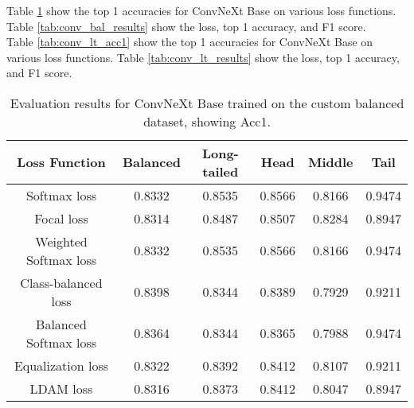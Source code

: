 Table \ref{tab:conv_bal_acc1} show the top 1 accuracies for ConvNeXt Base on various loss functions. Table \ref{tab:conv_bal_results} show the loss, top 1 accuracy, and F1 score.\\

Table \ref{tab:conv_lt_acc1} show the top 1 accuracies for ConvNeXt Base on various loss functions. Table \ref{tab:conv_lt_results} show the loss, top 1 accuracy, and F1 score.

\begin{table}[h!]
    \centering
    \begin{tabular}{cccccc}
        \toprule
        Loss Function & Balanced & Long-tailed & Head & Middle & Tail \\ 
        \midrule
        Softmax loss   & 0.8332 & 0.8535 & 0.8566 & 0.8166 & 0.9474 \\
        Focal loss   & 0.8314 & 0.8487 & 0.8507 & 0.8284 & 0.8947 \\
        Weighted Softmax loss   & 0.8332 & 0.8535 & 0.8566 &  0.8166 & 0.9474 \\
        Class-balanced loss   & 0.8398 & 0.8344 & 0.8389 & 0.7929 & 0.9211 \\
        Balanced Softmax loss   & 0.8364 & 0.8344 & 0.8365 & 0.7988 & 0.9474 \\
        Equalization loss   & 0.8322 & 0.8392 & 0.8412 & 0.8107 & 0.9211 \\
        LDAM loss   & 0.8316 & 0.8373 & 0.8412 & 0.8047 & 0.8947 \\
        \bottomrule
    \end{tabular}
    \caption{Evaluation results for ConvNeXt Base trained on the custom balanced dataset, showing Acc1.}
    \label{tab:conv_bal_acc1}
\end{table}

